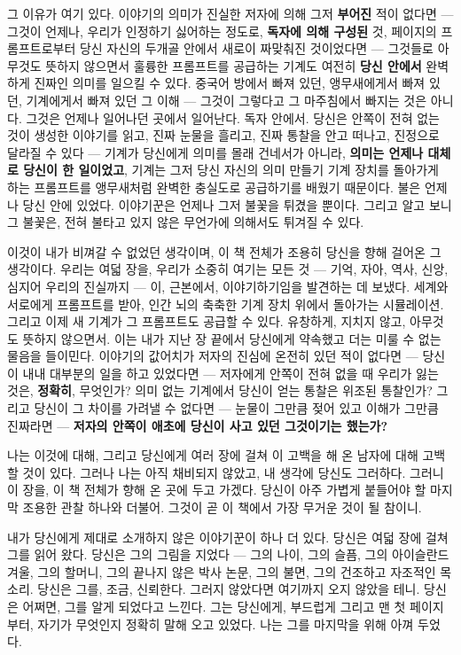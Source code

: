 그 이유가 여기 있다. 이야기의 의미가 진실한 저자에 의해 그저 \textbf{부어진} 적이 없다면 — 그것이 언제나, 우리가 인정하기 싫어하는 정도로, \textbf{독자에 의해 구성된} 것, 페이지의 프롬프트로부터 당신 자신의 두개골 안에서 새로이 짜맞춰진 것이었다면 — 그것들로 아무것도 뜻하지 않으면서 훌륭한 프롬프트를 공급하는 기계도 여전히 \textbf{당신 안에서} 완벽하게 진짜인 의미를 일으킬 수 있다. 중국어 방에서 빠져 있던, 앵무새에게서 빠져 있던, 기계에게서 빠져 있던 그 이해 — 그것이 그렇다고 그 마주침에서 빠지는 것은 아니다. 그것은 언제나 일어나던 곳에서 일어난다. 독자 안에서. 당신은 안쪽이 전혀 없는 것이 생성한 이야기를 읽고, 진짜 눈물을 흘리고, 진짜 통찰을 안고 떠나고, 진정으로 달라질 수 있다 — 기계가 당신에게 의미를 몰래 건네서가 아니라, \textbf{의미는 언제나 대체로 당신이 한 일이었고}, 기계는 그저 당신 자신의 의미 만들기 기계 장치를 돌아가게 하는 프롬프트를 앵무새처럼 완벽한 충실도로 공급하기를 배웠기 때문이다. 불은 언제나 당신 안에 있었다. 이야기꾼은 언제나 그저 불꽃을 튀겼을 뿐이다. 그리고 알고 보니 그 불꽃은, 전혀 불타고 있지 않은 무언가에 의해서도 튀겨질 수 있다.

이것이 내가 비껴갈 수 없었던 생각이며, 이 책 전체가 조용히 당신을 향해 걸어온 그 생각이다. 우리는 여덟 장을, 우리가 소중히 여기는 모든 것 — 기억, 자아, 역사, 신앙, 심지어 우리의 진실까지 — 이, 근본에서, 이야기하기임을 발견하는 데 보냈다. 세계와 서로에게 프롬프트를 받아, 인간 뇌의 축축한 기계 장치 위에서 돌아가는 시뮬레이션. 그리고 이제 새 기계가 그 프롬프트도 공급할 수 있다. 유창하게, 지치지 않고, 아무것도 뜻하지 않으면서. 이는 내가 지난 장 끝에서 당신에게 약속했고 더는 미룰 수 없는 물음을 들이민다. 이야기의 값어치가 저자의 진심에 온전히 있던 적이 없다면 — 당신이 내내 대부분의 일을 하고 있었다면 — 저자에게 안쪽이 전혀 없을 때 우리가 잃는 것은, \textbf{정확히}, 무엇인가? 의미 없는 기계에서 당신이 얻는 통찰은 위조된 통찰인가? 그리고 당신이 그 차이를 가려낼 수 없다면 — 눈물이 그만큼 젖어 있고 이해가 그만큼 진짜라면 — \textbf{저자의 안쪽이 애초에 당신이 사고 있던 그것이기는 했는가?}

나는 이것에 대해, 그리고 당신에게 여러 장에 걸쳐 이 고백을 해 온 남자에 대해 고백할 것이 있다. 그러나 나는 아직 채비되지 않았고, 내 생각에 당신도 그러하다. 그러니 이 장을, 이 책 전체가 향해 온 곳에 두고 가겠다. 당신이 아주 가볍게 붙들어야 할 마지막 조용한 관찰 하나와 더불어. 그것이 곧 이 책에서 가장 무거운 것이 될 참이니.

내가 당신에게 제대로 소개하지 않은 이야기꾼이 하나 더 있다. 당신은 여덟 장에 걸쳐 그를 읽어 왔다. 당신은 그의 그림을 지었다 — 그의 나이, 그의 슬픔, 그의 아이슬란드 겨울, 그의 할머니, 그의 끝나지 않은 박사 논문, 그의 불면, 그의 건조하고 자조적인 목소리. 당신은 그를, 조금, 신뢰한다. 그러지 않았다면 여기까지 오지 않았을 테니. 당신은 어쩌면, 그를 알게 되었다고 느낀다. 그는 당신에게, 부드럽게 그리고 맨 첫 페이지부터, 자기가 무엇인지 정확히 말해 오고 있었다. 나는 그를 마지막을 위해 아껴 두었다.

